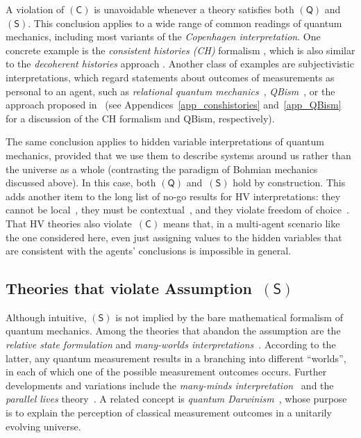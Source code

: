 \documentclass{article}
\theoremstyle{mystyle}
\theoremstyle{definition}
\newcommand*{\QT}{\mathsf{(Q)}}
\newcommand*{\SW}{\mathsf{(S)}}
\newcommand*{\SelfCons}{\mathsf{(C)}}
\begin{document}
A violation of $\SelfCons$ is unavoidable whenever a theory  satisfies both $\QT$ and $\SW$. This conclusion applies to a wide range of common readings of quantum mechanics, including most variants of the \emph{Copenhagen interpretation}.  One concrete example is the \emph{consistent histories (CH)} formalism \cite{Griffiths84,Omnes92,Griffiths02}, which is also similar to the \emph{decoherent histories} approach \cite{GelHar90,Hartle11}. Another class of examples are subjectivistic interpretations, which regard statements about outcomes of measurements  as personal to an agent, such as \emph{relational quantum mechanics}~\cite{Rovelli96},  \emph{QBism}~\cite{FucSch13,FuMeSc14}, or  the approach proposed in~\cite{Brukner2017} (see Appendices~\ref{app_conshistories} and~\ref{app_QBism}   for a discussion of the CH formalism and QBism, respectively).
  
The same conclusion applies to hidden variable interpretations of quantum mechanics, provided that we use them to describe systems around us rather than the universe as a whole (contrasting the paradigm of Bohmian mechanics discussed above).  In this case, both $\QT$ and~$\SW$ hold by construction. This adds another item to the long list of no-go results for HV interpretations: they cannot  be local~\cite{Bell66}, they must be contextual~\cite{Bell64,KocSpe67}, and they violate freedom of choice~\cite{ColRen11,ColRen13}. That HV theories also violate~$\SelfCons$ means that, in a multi-agent scenario like the one considered here, even just assigning values to the hidden variables that are consistent with the agents' conclusions is impossible in general.

\smallskip

\subsection{Theories that violate Assumption~$\SW$} \label{sec_Sviolation}

Although intuitive, $\SW$ is not implied by the bare mathematical formalism of quantum mechanics.  Among the theories that abandon the assumption are  the \emph{relative state formulation} and \emph{many-worlds interpretations}~\cite{Everett57,Wheeler57,DeWitt70,Deutsch85,Deutsch97}. According to the latter, any quantum measurement results in a branching into different ``worlds'', in each of which one of the possible measurement outcomes occurs. Further developments and variations include the \emph{many-minds interpretation}~\cite{Zeh70, AlbLoe88} and the \emph{parallel lives} theory~\cite{Brassard13}. A related concept is  \emph{quantum Darwinism}~\cite{Zurek07}, whose purpose is to explain the perception of classical measurement outcomes in a unitarily evolving universe.  
\end{document}
